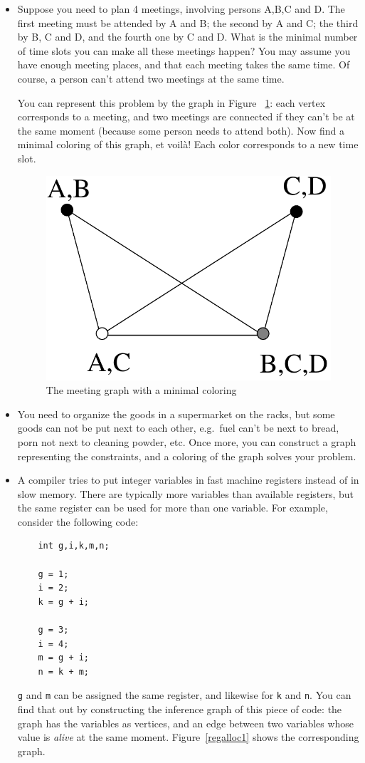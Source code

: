 \begin{itemize}
\item
Suppose you need to plan 4 meetings, involving persons A,B,C and D. The
first meeting must be attended by A and B; the second by A and C; the
third by B, C and D, and the fourth one by C and D. What is the
minimal number of time slots you can make all these meetings happen?
You may assume you have enough meeting places, and that each meeting
takes the same time. Of course, a person can't attend two meetings at
the same time.

You can represent this problem by the graph in Figure~
\ref{planning1}: each vertex corresponds to a meeting, and two
meetings are connected if they can't be at the same moment (because
some person needs to attend both). Now find a minimal coloring of this
graph, et voil\`{a}! Each color corresponds to a new time slot.
\begin{figure}[ht]
	\centering
	\includegraphics[width=0.2\linewidth,keepaspectratio]{planning1}
	\caption{The meeting graph with a minimal coloring\label{planning1}}
\end{figure}

\item
You need to organize the goods in a supermarket on the racks, but some
goods can not be put next to each other, e.g.\ fuel can't be next to
bread, porn not next to cleaning powder, etc. Once more, you can
construct a graph representing the constraints, and a coloring of the
graph solves your problem.

\item
A compiler tries to put integer variables in fast machine registers
instead of in slow memory. There are typically more variables than
available registers, but the same register can be used for more than
one variable. For example, consider the following code:
\begin{center}
\begin{BVerbatim}
    int g,i,k,m,n;

    g = 1;
    i = 2;
    k = g + i;
    
    g = 3;
    i = 4;
    m = g + i;
    n = k + m;
\end{BVerbatim}
\end{center}
\texttt{g} and \texttt{m} can be assigned the same register, and likewise for \texttt{k}
and \texttt{n}. You can find that out by constructing the inference graph of
this piece of code: the graph has the variables as vertices, and an
edge between two variables whose value is {\em alive} at the same
moment. Figure~\ref{regalloc1} shows the corresponding graph.


\end{itemize}
